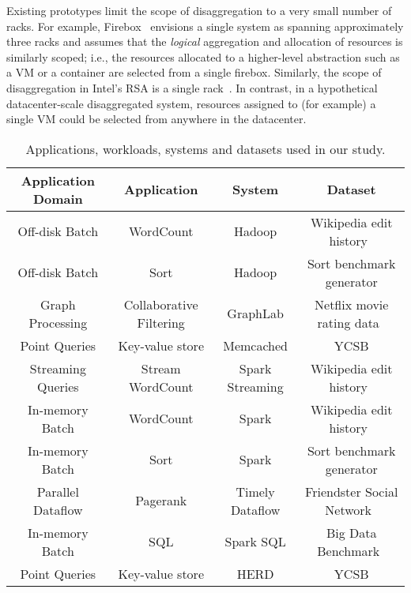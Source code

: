  Existing prototypes limit the scope of disaggregation to a very small number of racks. For example, Firebox~\cite{firebox} envisions a single system as spanning approximately three racks and assumes that the \emph{logical} aggregation and allocation of resources is similarly scoped; i.e., the resources allocated to a higher-level abstraction such as a VM or a container are selected from a single firebox. Similarly, the scope of disaggregation in Intel's RSA is a single rack~\cite{rsa}. In contrast, in a hypothetical datacenter-scale disaggregated system, resources assigned to (for example) a single VM could be selected from anywhere in the datacenter.  
%

\begin{table*}[t]
  \centering
  \small
  \begin{tabular}{c|c|c|c}
		\textbf{Application Domain} & \textbf{Application} & \textbf{System} & \textbf{Dataset} \\\hline \hline
		
    Off-disk Batch & WordCount & Hadoop & Wikipedia edit history~\cite{wikipedia}\\
     Off-disk Batch & Sort & Hadoop & Sort benchmark generator\\
     Graph Processing & Collaborative Filtering & GraphLab & Netflix movie rating data~\cite{netflix}\\
    Point Queries & Key-value store & Memcached & YCSB\\
    Streaming Queries & Stream WordCount & Spark Streaming & Wikipedia edit history~\cite{wikipedia}\\
    \hline
     \hline
     
    In-memory Batch & WordCount & Spark & Wikipedia edit history~\cite{wikipedia}\\
     In-memory Batch & Sort & Spark & Sort benchmark generator\\
     Parallel Dataflow & Pagerank & Timely Dataflow & Friendster Social Network~\cite{friendster}\\
     In-memory Batch & SQL & Spark SQL & Big Data Benchmark~\cite{bdb}\\
     Point Queries & Key-value store & HERD & YCSB\\\hline

    \hline
  \end{tabular}
  \caption{\small{Applications, workloads, systems and datasets used in our study.}}
  \label{tab:workloads}
\end{table*}
%

